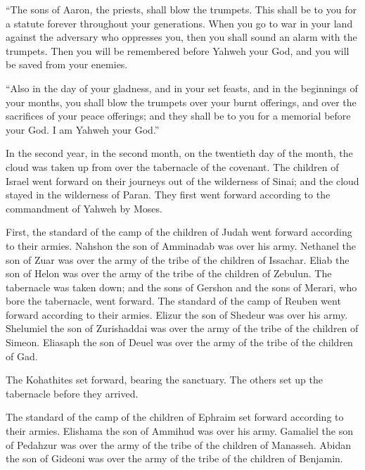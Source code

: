 ``The sons of Aaron, the priests, shall blow the
trumpets. This shall be to you for a statute forever throughout your
generations.  When you go to war in your land against the
adversary who oppresses you, then you shall sound an alarm with the
trumpets. Then you will be remembered before Yahweh your God, and you
will be saved from your enemies.

 ``Also in the day of your gladness, and in your set
feasts, and in the beginnings of your months, you shall blow the
trumpets over your burnt offerings, and over the sacrifices of your
peace offerings; and they shall be to you for a memorial before your
God. I am Yahweh your God.''

 In the second year, in the second month, on the
twentieth day of the month, the cloud was taken up from over the
tabernacle of the covenant.  The children of Israel went
forward on their journeys out of the wilderness of Sinai; and the cloud
stayed in the wilderness of Paran.  They first went
forward according to the commandment of Yahweh by Moses.

 First, the standard of the camp of the children of Judah
went forward according to their armies. Nahshon the son of Amminadab was
over his army.  Nethanel the son of Zuar was over the
army of the tribe of the children of Issachar.  Eliab the
son of Helon was over the army of the tribe of the children of Zebulun.
 The tabernacle was taken down; and the sons of Gershon
and the sons of Merari, who bore the tabernacle, went forward.
 The standard of the camp of Reuben went forward
according to their armies. Elizur the son of Shedeur was over his army.
 Shelumiel the son of Zurishaddai was over the army of
the tribe of the children of Simeon.  Eliasaph the son of
Deuel was over the army of the tribe of the children of Gad.

 The Kohathites set forward, bearing the sanctuary. The
others set up the tabernacle before they arrived.

 The standard of the camp of the children of Ephraim set
forward according to their armies. Elishama the son of Ammihud was over
his army.  Gamaliel the son of Pedahzur was over the army
of the tribe of the children of Manasseh.  Abidan the son
of Gideoni was over the army of the tribe of the children of Benjamin.

